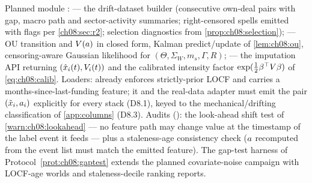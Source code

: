 \begin{codehooks}
Planned module :  --- the drift-dataset
builder (consecutive own-deal pairs with gap, macro path and
sector-activity summaries; right-censored spells emitted with flags per
\cref{ch08:sec:r2}; selection diagnostics from
\cref{prop:ch08:selection});  --- OU transition and
$V(a)$ in closed form, Kalman predict/update of
\cref{lem:ch08:ou}, censoring-aware Gaussian likelihood for $(\Theta,
\Sigma_W, m_s, \Gamma, R)$;  --- the imputation API
returning $(\hat{x}_i(t), V_i(t))$ and the calibrated intensity factor
$\exp(\tfrac12\beta^{\top} V\beta)$ of \cref{eq:ch08:calib}. Loaders:
 already enforces strictly-prior LOCF and
carries a months-since-last-funding feature; it and the real-data
adapter  must emit the pair $(\tilde{x}_i,
a_i)$ explicitly for every stack (D8.1), keyed to the
mechanical/drifting classification of \cref{app:columns} (D8.3).
Audits (): the look-ahead shift test of
\cref{warn:ch08:lookahead} --- no feature path may change value at the
timestamp of the label event it feeds --- plus a staleness-age
consistency check ($a$ recomputed from the event list must match
the emitted feature). The gap-test harness of Protocol~\ref{prot:ch08:gaptest}
extends the planned covariate-noise campaign with LOCF-age worlds and
staleness-decile ranking reports.
\end{codehooks}
